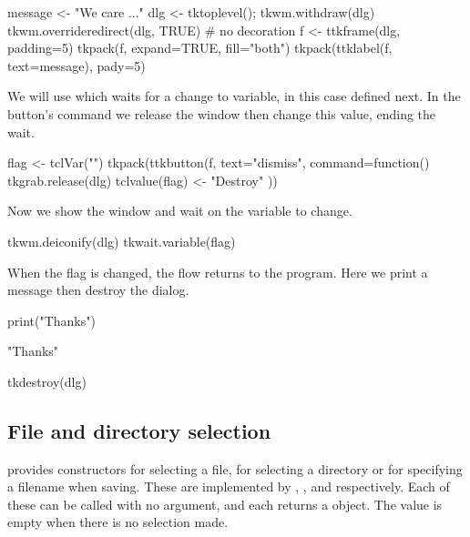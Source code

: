 \begin{Schunk}
\begin{Sinput}
 message <- "We care ..."
 dlg <- tktoplevel(); tkwm.withdraw(dlg)
 tkwm.overrideredirect(dlg, TRUE)   # no decoration
 f <- ttkframe(dlg, padding=5)
 tkpack(f, expand=TRUE, fill="both")
 tkpack(ttklabel(f, text=message), pady=5)
\end{Sinput}
\end{Schunk}

We will use  which waits for a change to
variable, in this case  defined next. In the button's command
we release the window then change this value, ending the wait.
\begin{Schunk}
\begin{Sinput}
 flag <- tclVar("")
 tkpack(ttkbutton(f, text="dismiss", command=function() {
   tkgrab.release(dlg)
   tclvalue(flag) <- "Destroy"
 }))
\end{Sinput}
\end{Schunk}
Now we show the window and wait on the  variable to change.
\begin{Schunk}
\begin{Sinput}
 tkwm.deiconify(dlg)
 tkwait.variable(flag)
\end{Sinput}
\end{Schunk}

When the flag is changed, the flow returns to the program. Here we
print a message then destroy the dialog.
\begin{Schunk}
\begin{Sinput}
 print("Thanks")
\end{Sinput}
\begin{Soutput}
[1] "Thanks"
\end{Soutput}
\begin{Sinput}
 tkdestroy(dlg)
\end{Sinput}
\end{Schunk}


\subsection{File and directory selection}
\label{sec:file-direct-select}

\Tk\/ provides constructors for selecting a file, for selecting a
directory or for specifying a filename when saving. These are
implemented by ,
, and 
respectively. Each of these can be called with no argument, and
each returns a  object. The value is empty when there is no selection made.

